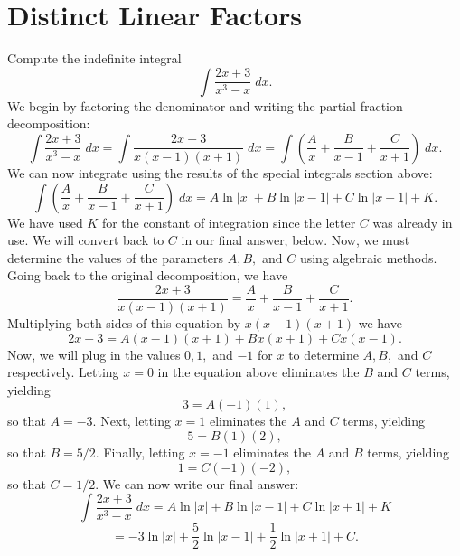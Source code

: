 \documentclass[handout]{ximera}
\begin{document}
\section{Distinct Linear Factors}



\begin{example}[example 5]

Compute the indefinite integral
\[
\int \frac{2x+3}{x^3 -x} \; dx.
\]
We begin by factoring the denominator and writing the partial fraction decomposition:
\[
\int \frac{2x+3}{x^3 -x} \; dx = \int \frac{2x+3}{x(x-1)(x+1)} \; dx = \int \left( \frac{A}{x} + \frac{B}{x-1} + \frac{C}{x+1} \right) \; dx.
\]
We can now integrate using the results of the special integrals section above:
\[
\int \left( \frac{A}{x} + \frac{B}{x-1} + \frac{C}{x+1} \right) \; dx = A\ln|x| + B\ln|x-1| + C\ln|x+1| + K.
\]
We have used $K$ for the constant of integration since the letter $C$ was already in use.  We will convert back to $C$ in our final answer, below.
Now, we must determine the values of the parameters $A, B, $ and $C$ using algebraic methods.
Going back to the original decomposition, we have
\[
\frac{2x+3}{x(x-1)(x+1)} = \frac{A}{x}  + \frac{B}{x-1} + \frac{C}{x+1}.
\]
Multiplying both sides of this equation by $x(x-1)(x+1)$ we have
\[
2x+3 = A(x-1)(x+1) + Bx(x+1) + Cx(x-1).
\]
Now, we will plug in the values $0, 1, $ and $-1$ for $x$ to determine $A, B, $ and $C$ respectively.
Letting $x = 0$ in the equation above eliminates the $B$ and $C$ terms, yielding
\[
3 = A(-1)(1),
\]
so that $A = -3$.
Next, letting $x = 1$ eliminates the $A$ and $C$ terms, yielding
\[
5 = B(1)(2),
\]
so that $B = 5/2$. Finally, letting $x = -1$ eliminates the $A$ and $B$ terms, yielding
\[
1 = C(-1)(-2),
\]
so that $C = 1/2$.
We can now write our final answer:
\[
\int \frac{2x+3}{x^3 -x} \; dx = A\ln|x| + B\ln|x-1| + C\ln|x+1| + K
\]
\[
 = -3\ln|x| + \frac52 \ln|x-1| + \frac12 \ln|x+1| + C.
\]

\end{example}



\begin{center}
\begin{foldable}
\end{foldable}
\end{center}
\end{document}
